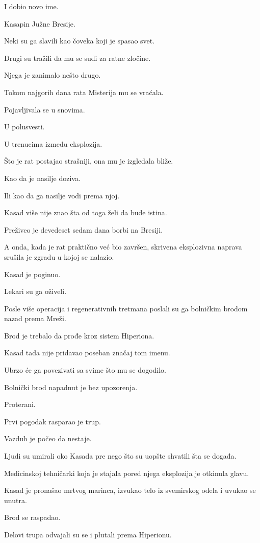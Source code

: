 I dobio novo ime.

Kasapin Južne Bresije.

Neki su ga slavili kao čoveka koji je spasao svet.

Drugi su tražili da mu se sudi za ratne zločine.

Njega je zanimalo nešto drugo.

Tokom najgorih dana rata Misterija mu se vraćala.

Pojavljivala se u snovima.

U polusvesti.

U trenucima između eksplozija.

Što je rat postajao strašniji, ona mu je izgledala bliže.

Kao da je nasilje doziva.

Ili kao da ga nasilje vodi prema njoj.

Kasad više nije znao šta od toga želi da bude istina.

\bigskip

Preživeo je devedeset sedam dana borbi na Bresiji.

A onda, kada je rat praktično već bio završen, skrivena eksplozivna naprava srušila je zgradu u kojoj se nalazio.

Kasad je poginuo.

Lekari su ga oživeli.

Posle više operacija i regenerativnih tretmana poslali su ga bolničkim brodom nazad prema Mreži.

Brod je trebalo da prođe kroz sistem Hiperiona.

Kasad tada nije pridavao poseban značaj tom imenu.

Ubrzo će ga povezivati sa svime što mu se dogodilo.

Bolnički brod napadnut je bez upozorenja.

Proterani.

Prvi pogodak rasparao je trup.

Vazduh je počeo da nestaje.

Ljudi su umirali oko Kasada pre nego što su uopšte shvatili šta se događa.

Medicinskoj tehničarki koja je stajala pored njega eksplozija je otkinula glavu.

Kasad je pronašao mrtvog marinca, izvukao telo iz svemirskog odela i uvukao se unutra.

Brod se raspadao.

Delovi trupa odvajali su se i plutali prema Hiperionu.

